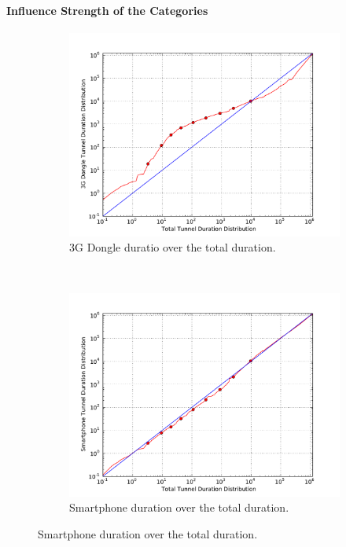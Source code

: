 \paragraph{Influence Strength of the Categories}

\begin{figure}[htb]
        \centering
        \begin{subfigure}[b]{0.50\textwidth}
            \centering
            \includegraphics[width=\textwidth]{images/qq-total-vs-dongle.pdf}
            \caption{3G Dongle duratio over the total duration.}
            \label{c4:fig:qq-total-vs-dongle}
        \end{subfigure}%
        ~
        \begin{subfigure}[b]{0.50\textwidth}
            \centering
            \includegraphics[width=\textwidth]{images/qq-total-vs-smartphone.pdf}
            \caption{Smartphone duration over the total duration.}
            \label{c4:fig:qq-total-vs-smartphones}
        \end{subfigure}


\end{figure}
